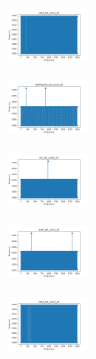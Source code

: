 \begin{figure}[H]
    \begin{subfigure}
        \centering
        \includegraphics[width=0.234\textwidth]{img/ageun/rand_set_const_20_277451237_time.png}
    \end{subfigure}
    \hfill
    \begin{subfigure}
        \centering
        \includegraphics[width=0.234\textwidth]{img/ageun/newthyroid_set_const_20_277451237_time.png}
    \end{subfigure}
    \hfill
    \begin{subfigure}
        \centering
        \includegraphics[width=0.234\textwidth]{img/ageun/iris_set_const_20_49258669_time.png}
    \end{subfigure}
    \hfill
    \begin{subfigure}
        \centering
        \includegraphics[width=0.234\textwidth]{img/ageun/ecoli_set_const_20_49258669_time.png}
    \end{subfigure}
    \hfill
    \begin{subfigure}
        \centering
        \includegraphics[width=0.234\textwidth]{img/ageun/rand_set_const_20_49258669_time.png}
    \end{subfigure}
    \hfill
    \begin{subfigure}
        \centering

\end{subfigure}
\end{figure}
